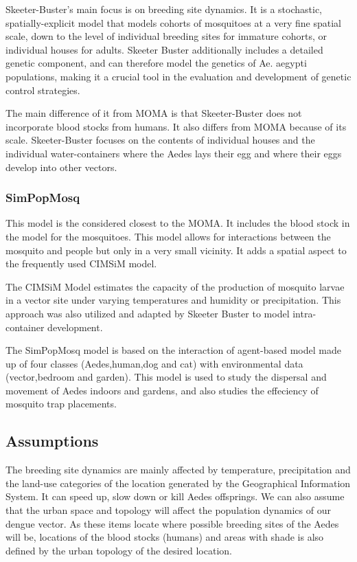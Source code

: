 Skeeter-Buster's main focus is on breeding site dynamics. It is a stochastic, spatially-explicit model that models cohorts of mosquitoes at a very fine spatial scale, down to the level of individual breeding sites for immature cohorts, or individual houses for adults. Skeeter Buster additionally includes a detailed genetic component, and can therefore model the genetics of Ae. aegypti populations, making it a crucial tool in the evaluation and development of genetic control strategies. 

The main difference of it from MOMA is that Skeeter-Buster does not incorporate blood stocks from humans. It also differs from MOMA because of its scale. Skeeter-Buster focuses on the contents of individual houses and the individual water-containers where the Aedes lays their egg and where their eggs develop into other vectors. 

\subsubsection{SimPopMosq}

This model is the considered closest to the MOMA. It includes the blood stock in the model for the mosquitoes. This model allows for interactions between the mosquito and people but only in a very small vicinity. It adds a spatial aspect to the frequently used CIMSiM model. 

The CIMSiM Model estimates the capacity of the production of mosquito larvae in a vector site under varying temperatures and humidity or precipitation. This approach was also utilized and adapted by Skeeter Buster to model intra-container development.

The SimPopMosq model is based on the interaction of agent-based model made up of four classes (Aedes,human,dog and cat) with environmental data (vector,bedroom and garden). This model is used to study the dispersal and movement of Aedes indoors and gardens, and also studies the effeciency of mosquito trap placements.


\subsection{Assumptions}
The breeding site dynamics are mainly affected by temperature, precipitation and the land-use categories of the location generated by the Geographical Information System. It can speed up, slow down or kill Aedes offsprings. We can also assume that the urban space and topology will affect the population dynamics of our dengue vector. As these items locate where possible breeding sites of the Aedes will be, locations of the blood stocks (humans) and areas with shade is also defined by the urban topology of the desired location.

